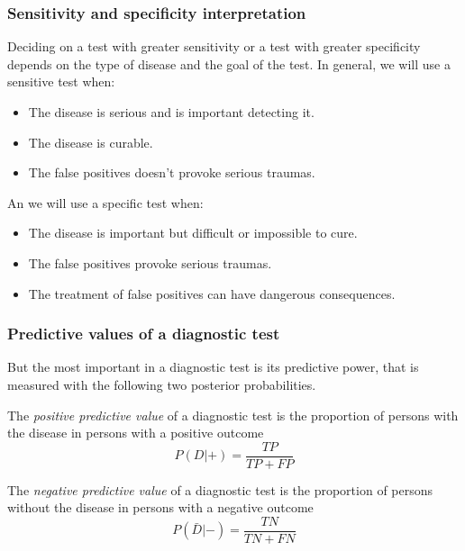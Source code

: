\begin{frame}
\frametitle{Sensitivity and specificity interpretation}
Deciding on a test with greater sensitivity or a test with greater specificity depends on the type of disease and the
goal of the test.
In general, we will use a sensitive test when:
\begin{itemize}
\item The disease is serious and is important detecting it. 
\item The disease is curable. 
\item The false positives doesn't provoke serious traumas.
\end{itemize}

An we will use a specific test when:
\begin{itemize}
\item The disease is important but difficult or impossible to cure.
\item The false positives provoke serious traumas. 
\item The treatment of false positives can have dangerous consequences.  
\end{itemize}
\end{frame}


\begin{frame}
\frametitle{Predictive values of a diagnostic test}
But the most important in a diagnostic test is its predictive power, that is measured with the following two posterior 
probabilities.
\begin{definition}
The \emph{positive predictive value} of a diagnostic test is the proportion of persons with the disease in persons with
a positive outcome
\[
P(D|+) = \frac{TP}{TP+FP}
\]
\end{definition}

\begin{definition}
The \emph{negative predictive value} of a diagnostic test is the proportion of persons without the disease in persons
with a negative outcome 
\[
P(\bar D|-) = \frac{TN}{TN+FN}
\]
\end{definition}
\end{frame}


